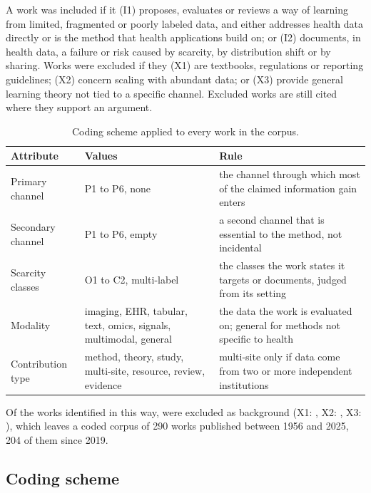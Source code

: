 \documentclass[acmsmall,screen,review]{acmart}
\theoremstyle{acmdefinition}
\begin{document}
A work was included if it (I1) proposes, evaluates or reviews a way of learning from limited, fragmented or poorly labeled data, and either addresses health data directly or is the method that health applications build on; or (I2) documents, in health data, a failure or risk caused by scarcity, by distribution shift or by sharing. Works were excluded if they (X1) are textbooks, regulations or reporting guidelines; (X2) concern scaling with abundant data; or (X3) provide general learning theory not tied to a specific channel. Excluded works are still cited where they support an argument.

\begin{table}[t]
\caption{Coding scheme applied to every work in the corpus.}
\label{tab:coding}
\footnotesize
\begin{tabularx}{\linewidth}{@{}p{2.3cm}p{2.5cm}X@{}}
\toprule
Attribute & Values & Rule\\
\midrule
Primary channel & P1 to P6, none & the channel through which most of the claimed information gain enters\\
Secondary channel & P1 to P6, empty & a second channel that is essential to the method, not incidental\\
Scarcity classes & O1 to C2, multi-label & the classes the work states it targets or documents, judged from its setting\\
Modality & imaging, EHR, tabular, text, omics, signals, multimodal, general & the data the work is evaluated on; general for methods not specific to health\\
Contribution type & method, theory, study, multi-site, resource, review, evidence & multi-site only if data come from two or more independent institutions\\
\bottomrule
\end{tabularx}
\end{table}

\noindent Of the \PrismaBibTotal{} works identified in this way, \PrismaBgTotal{} were excluded as background (X1: \PrismaBgXOne, X2: \PrismaBgXTwo, X3: \PrismaBgXThree), which leaves a coded corpus of 290 works published between 1956 and 2025, 204 of them since 2019.

\subsection{Coding scheme}
\end{document}
